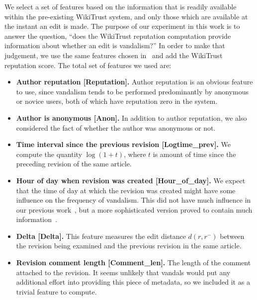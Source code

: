 We select a set of features based on the information that is readily
available within the pre-existing WikiTrust system, and only those which
are available at the instant an edit is made.
The purpose of our experiment in this work is to answer the question,
``does the WikiTrust reputation computation provide information about
whether an edit is vandalism?''
In order to make that judgement, we use the same features chosen
in~\cite{Adler2010b} and add the WikiTrust reputation score.
The total set of features we used are:
%
\begin{itemize}

\item \textbf{Author reputation [Reputation].}  Author reputation is an
obvious feature to use, since vandalism tends to be performed
predominantly by anonymous or novice users, both of which have
reputation zero in the system.

\item \textbf{Author is anonymous [Anon].}  In addition to author
reputation, we also considered the fact of whether the author was
anonymous or not.

\item \textbf{Time interval since the previous revision [Logtime\_prev].}
We compute the quantity $\log(1 + t)$, where $t$ is amount of time since
the preceding revision of the same article.

\item \textbf{Hour of day when revision was created [Hour\_of\_day].}
We expect that the time of day at which the revision was created
might have some influence on the frequency of vandalism.
This did not have much influence in our previous work~\cite{Adler2010b},
but a more sophisticated version proved to contain much
information~\cite{West2010}.

\item \textbf{Delta [Delta].}
This feature measures the edit distance $d(r, r^{-})$ between the
revision being examined and the previous revision in the same article.

\item \textbf{Revision comment length [Comment\_len].}
The length of the comment attached to the revision.
It seems unlikely that vandals would put any additional effort into
providing this piece of metadata, so we included it as a trivial feature
to compute.


\end{itemize}

